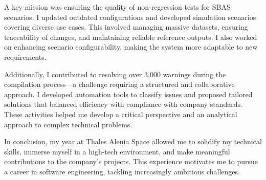 A key mission was ensuring the quality of non-regression tests for SBAS scenarios. I updated outdated configurations and developed simulation scenarios covering diverse use cases. This involved managing massive datasets, ensuring traceability of changes, and maintaining reliable reference outputs. I also worked on enhancing scenario configurability, making the system more adaptable to new requirements.

Additionally, I contributed to resolving over 3,000 warnings during the compilation process—a challenge requiring a structured and collaborative approach. I developed automation tools to classify issues and proposed tailored solutions that balanced efficiency with compliance with company standards. These activities helped me develop a critical perspective and an analytical approach to complex technical problems.

In conclusion, my year at Thales Alenia Space allowed me to solidify my technical skills, immerse myself in a high-tech environment, and make meaningful contributions to the company’s projects. This experience motivates me to pursue a career in software engineering, tackling increasingly ambitious challenges.